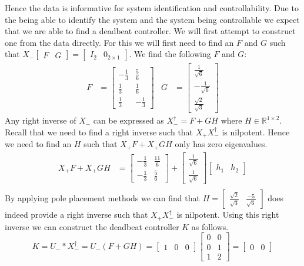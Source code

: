 Hence the data is informative for system identification and controllability. Due to the being able to identify the system and the system being controllable we expect that we are able to find a deadbeat controller. We will first attempt to construct one from the data directly. For this we will first need to find an $F$ and $G$ such that $X_- \begin{bmatrix}F&G\end{bmatrix} = \begin{bmatrix}I_2&0_{2\times 1}\end{bmatrix}$. We find the following $F$ and $G$:
\begin{align*}
F &= \begin{bmatrix}
	-\frac{1}{3} & \frac{5}{6} \\ \frac{1}{3} & \frac{1}{6} \\ \frac{1}{3} & -\frac{1}{3}
\end{bmatrix} &
G &= \begin{bmatrix}
	\frac{1}{\sqrt{6}} \\ -\frac{1}{\sqrt{6}} \\ \frac{\sqrt{2}}{\sqrt{3}}
\end{bmatrix}
\end{align*}
Any right inverse of $X_-$ can be expressed as $X_-^\dagger = F + G H$ where $H \in \mathbb{R}^{1 \times 2}$. Recall that we need to find a right inverse such that $X_+ X_-^\dagger$ is nilpotent. Hence we need to find an $H$ such that $X_+ F + X_+ G H$ only has zero eigenvalues. 
\begin{align*}
X_+ F + X_+ G H &= \begin{bmatrix} -\frac{1}{3} & \frac{11}{6} \\ -\frac{1}{3} & \frac{5}{6} \end{bmatrix} + \begin{bmatrix}\frac{1}{\sqrt{6}} \\ \frac{1}{\sqrt{6}}\end{bmatrix} \begin{bmatrix} h_1 & h_2 \end{bmatrix} \\
\end{align*} 
By applying pole placement methods we can find that $H = \begin{bmatrix} \frac{\sqrt{2}}{\sqrt{3}} & \frac{-5}{\sqrt{6}} \end{bmatrix}$ does indeed provide a right inverse such that $X_+ X_-^\dagger$ is nilpotent. Using this right inverse we can construct the deadbeat controller $K$ as follows.
\[ K = U_- * X_-^\dagger = U_- (F + G H) = \begin{bmatrix} 1&0&0 \end{bmatrix} \begin{bmatrix} 0&0\\0&1\\1&2 \end{bmatrix} = \begin{bmatrix} 0&0 \end{bmatrix} \] 

